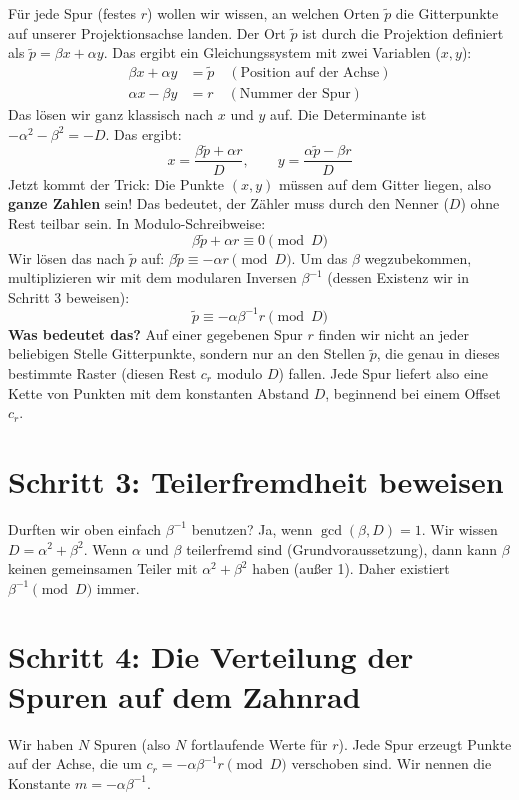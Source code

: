 \documentclass[11pt]{article}
\begin{document}
Für jede Spur (festes $r$) wollen wir wissen, an welchen Orten $\tilde{p}$ die Gitterpunkte auf unserer Projektionsachse landen. Der Ort $\tilde{p}$ ist durch die Projektion definiert als $\tilde{p} = \beta x + \alpha y$. 
Das ergibt ein Gleichungssystem mit zwei Variablen ($x, y$):
\begin{align*}
    \beta x + \alpha y &= \tilde{p} \quad (\text{Position auf der Achse})\\
    \alpha x - \beta y &= r \quad (\text{Nummer der Spur})
\end{align*}
Das lösen wir ganz klassisch nach $x$ und $y$ auf. Die Determinante ist $-\alpha^2 - \beta^2 = -D$. Das ergibt:
\[
    x = \frac{\beta\tilde{p} + \alpha r}{D}, \qquad y = \frac{\alpha\tilde{p} - \beta r}{D}
\]
Jetzt kommt der Trick: Die Punkte $(x,y)$ müssen auf dem Gitter liegen, also \textbf{ganze Zahlen} sein! Das bedeutet, der Zähler muss durch den Nenner ($D$) ohne Rest teilbar sein. In Modulo-Schreibweise:
\[
    \beta\tilde{p} + \alpha r \equiv 0 \pmod D
\]
Wir lösen das nach $\tilde{p}$ auf: $\beta\tilde{p} \equiv -\alpha r \pmod D$.
Um das $\beta$ wegzubekommen, multiplizieren wir mit dem modularen Inversen $\beta^{-1}$ (dessen Existenz wir in Schritt 3 beweisen):
\[
    \tilde{p} \equiv -\alpha\beta^{-1} r \pmod D
\]
\textbf{Was bedeutet das?} Auf einer gegebenen Spur $r$ finden wir nicht an jeder beliebigen Stelle Gitterpunkte, sondern nur an den Stellen $\tilde{p}$, die genau in dieses bestimmte Raster (diesen Rest $c_r$ modulo $D$) fallen. Jede Spur liefert also eine Kette von Punkten mit dem konstanten Abstand $D$, beginnend bei einem Offset $c_r$.

\section{Schritt 3: Teilerfremdheit beweisen}

Durften wir oben einfach $\beta^{-1}$ benutzen? Ja, wenn $\gcd(\beta, D) = 1$. 
Wir wissen $D = \alpha^2 + \beta^2$. Wenn $\alpha$ und $\beta$ teilerfremd sind (Grundvoraussetzung), dann kann $\beta$ keinen gemeinsamen Teiler mit $\alpha^2 + \beta^2$ haben (außer 1). Daher existiert $\beta^{-1} \pmod D$ immer.

\section{Schritt 4: Die Verteilung der Spuren auf dem Zahnrad}

Wir haben $N$ Spuren (also $N$ fortlaufende Werte für $r$). Jede Spur erzeugt Punkte auf der Achse, die um $c_r = -\alpha\beta^{-1} r \pmod D$ verschoben sind.
Wir nennen die Konstante $m = -\alpha\beta^{-1}$. 
\end{document}
